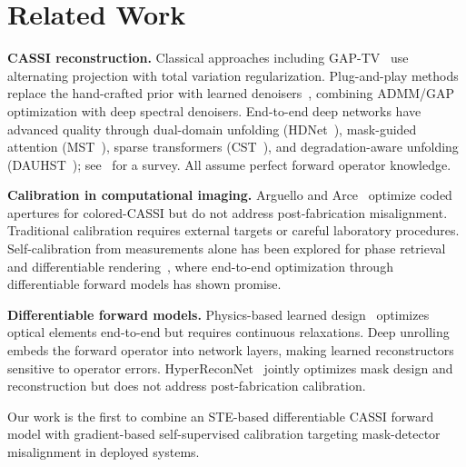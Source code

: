 \documentclass[runningheads]{llncs}
\begin{document}
\section{Related Work}
\label{sec:related}

\textbf{CASSI reconstruction.}
Classical approaches including GAP-TV~\cite{yuan2016gap,meng2020gap} use alternating projection with total variation regularization.
Plug-and-play methods replace the hand-crafted prior with learned denoisers~\cite{yuan2020pnpcassi,zheng2021deep}, combining ADMM/GAP optimization with deep spectral denoisers.
End-to-end deep networks have advanced quality through dual-domain unfolding (HDNet~\cite{hu2022hdnet}), mask-guided attention (MST~\cite{cai2022mst,cai2022mst_pp}), sparse transformers (CST~\cite{cai2022cst}), and degradation-aware unfolding (DAUHST~\cite{cai2022dauhst}); see~\cite{yuan2021snapshot} for a survey.
All assume perfect forward operator knowledge.

\textbf{Calibration in computational imaging.}
Arguello and Arce~\cite{arguello2013cassi_cal} optimize coded apertures for colored-CASSI but do not address post-fabrication misalignment.
Traditional calibration requires external targets or careful laboratory procedures.
Self-calibration from measurements alone has been explored for phase retrieval~\cite{metzler2018prdeep} and differentiable rendering~\cite{kellman2019physics}, where end-to-end optimization through differentiable forward models has shown promise.

\textbf{Differentiable forward models.}
Physics-based learned design~\cite{kellman2019physics} optimizes optical elements end-to-end but requires continuous relaxations.
Deep unrolling~\cite{ongie2020deep} embeds the forward operator into network layers, making learned reconstructors sensitive to operator errors.
HyperReconNet~\cite{wang2019hyperreconnet} jointly optimizes mask design and reconstruction but does not address post-fabrication calibration.

Our work is the first to combine an STE-based differentiable CASSI forward model with gradient-based self-supervised calibration targeting mask-detector misalignment in deployed systems.

\end{document}
